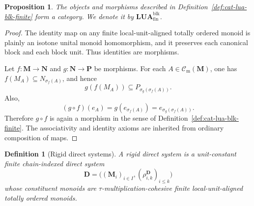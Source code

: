 \documentclass[pdflatex,sn-mathphys-num]{sn-jnl}
\theoremstyle{thmstyleone}%
\newtheorem{proposition}[theorem]{Proposition}
\theoremstyle{thmstyletwo}%
\theoremstyle{thmstylethree}%
\newtheorem{definition}[theorem]{Definition}
\newcommand{\Cm}{\mathcal C_{\mathrm m}}
\begin{document}
\begin{proposition}\label{prop:lua-blk-category}
The objects and morphisms described in Definition~\ref{def:cat-lua-blk-finite} form a category.
We denote it by \(\mathbf{LUA}^{\mathrm{blk}}_{\mathrm{fin}}\).
\end{proposition}

\begin{proof}
The identity map on any finite local-unit-aligned totally ordered monoid is plainly an isotone unital monoid homomorphism, and it preserves each canonical block and each block unit.
Thus identities are morphisms.

Let \(f\colon \mathbf M\to \mathbf N\) and \(g\colon \mathbf N\to \mathbf P\) be morphisms.
For each \(A\in \Cm(\mathbf M)\), one has \(f(M_A)\subseteq N_{\sigma_f(A)}\), and hence
\[
g(f(M_A))\subseteq P_{\sigma_g(\sigma_f(A))}.
\]
Also,
\[
(g\circ f)(e_A)
=
g(e_{\sigma_f(A)})
=
e_{\sigma_g(\sigma_f(A))}.
\]
Therefore \(g\circ f\) is again a morphism in the sense of Definition~\ref{def:cat-lua-blk-finite}.
The associativity and identity axioms are inherited from ordinary composition of maps.
\end{proof}

\begin{definition}[Rigid direct systems]\label{def:rigid-direct-system-object}
A \emph{rigid direct system} is a unit-constant finite chain-indexed direct system
\[
\mathbf D=\bigl((\mathbf M_i)_{i\in I},
(\rho^{\mathbf D}_{i,k})_{i\le k}\bigr)
\]
whose constituent monoids are \(\tau\)-multiplication-cohesive finite local-unit-aligned totally ordered monoids.
\end{definition}
\end{document}
